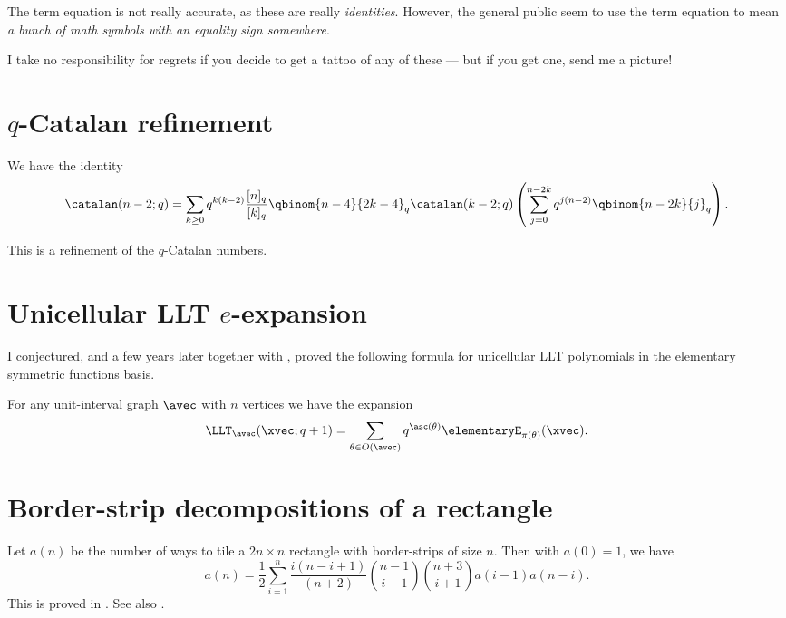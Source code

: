 

The term equation is not really accurate, as these are really \emph{identities}.
However, the general public seem to use the term equation to
mean \emph{a bunch of math symbols with an equality sign somewhere}.

I take no responsibility for regrets if you decide 
to get a tattoo of any of these --- but if you get one, send me a picture!


\section[myEquationsCatalan]{$q$-Catalan refinement}

We have the identity
\begin{equation*}
\catalan(n-2;q) = 
\sum_{k \geq 0}
q^{k(k-2)} \frac{[n]_q}{[k]_q} \qbinom{n-4}{2k-4}_q\catalan(k-2;q)
\left( \sum_{j=0}^{n-2k} q^{j(n-2)}\qbinom{n-2k}{j}_q\right).
\end{equation*}

This is a refinement of the \hyperref[prelimQanalogsCatalan]{$q$-Catalan numbers}.


\section[myEquationsLltE]{Unicellular LLT $e$-expansion}

I conjectured, and a few years later together with 
\cite{AlexanderssonSulzgruber2020x}, proved the following 
\hyperref[unicellularLLTEExpansion]{formula for unicellular LLT polynomials}
in the elementary symmetric functions basis.

For any unit-interval graph $\avec$ with $n$ vertices
we have the expansion
\begin{equation*}
\LLT_\avec(\xvec;q+1) =
\sum_{\theta \in O(\avec)} q^{\asc(\theta)}\elementaryE_{\pi(\theta)}(\xvec).
\end{equation*}

\section[myEquationsBSD]{Border-strip decompositions of a rectangle}

Let $a(n)$ be the number of ways to tile a $2n \times n$ rectangle with 
border-strips of size $n$. Then with $a(0)=1$, we have 
\[
 a(n) = 
 \frac{1}{2} \sum_{i=1}^n \frac{ i(n - i + 1)}{ (n + 2)} \binom{n - 1}{i - 1} 
\binom{n + 3}{i + 1} a(i - 1) a(n - i).
\]
This is proved in \cite{AlexanderssonJordan2018}. See also .


